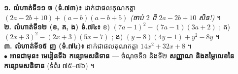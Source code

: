 \documentclass[a4paper,10pt]{article}
\begin{document}
\begin{tcolorbox}[enhanced, sharp corners, colback=white, colframe=black, boxrule=0.8pt, borderline={0.6pt}{2pt}{dashed}, top=3pt, bottom=3pt, left=6pt, right=6pt]
  \textbf{១. លំហាត់ទី១១ ច (ទំ.៧៣)៖} ដាក់ជាផលគុណកត្តា $(2a - 2b + 10) + (a - b)(a - b + 5)$ \textit{(ចាប់ $2$ ពី $2a-2b+10$ សិន!)} ។\\[1.5pt]
  \textbf{២. លំហាត់ទី១២ (ខ, គ, ង) ទំ.៧៤៖} ខ) $(7a-1)^2 - (7a-1)(3a+2)$ \;;\; គ) $(2x+3)^2 - (2x+3)(5x-7)$ \;;\; ង) $(y-8)(4y-1) + y^2 - 8y$ ។\\[1.5pt]
  \textbf{៣. លំហាត់ទី១៥ ញ (ទំ.៧៤)៖} ដាក់ជាផលគុណកត្តា $14x^2 + 32x + 8$ ។\\[1.5pt]
  $\bullet$ \textbf{អានជាមុន៖} \textbf{មេរៀនទី៦ កន្សោមសនិទាន} — ចំណុចទី១ និងទី២ \textbf{សញ្ញាណ និងតម្លៃលេខនៃកន្សោមសនិទាន} (ទំព័រ ៧៥--៧៦) ។
\end{tcolorbox}
\end{document}
